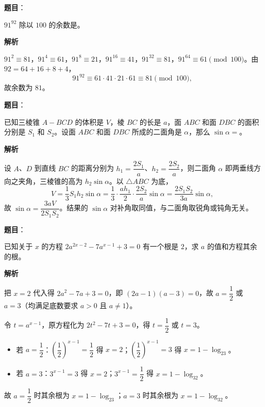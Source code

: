 \begin{answer}

\textbf{题目}：

$91^{92}$ 除以 $100$ 的余数是\underline{\qquad\qquad}。

\textbf{解析}

$91^2\equiv81$，$91^4\equiv61$，$91^8\equiv21$，$91^{16}\equiv41$，$91^{32}\equiv81$，$91^{64}\equiv61\pmod{100}$。由 $92=64+16+8+4$，
\nopagebreak[4]
\[
91^{92}\equiv61\cdot41\cdot21\cdot61\equiv81\pmod{100},
\]
故余数为 $81$。


\end{answer}
\begin{answer}

\textbf{题目}：

已知三棱锥 $A-BCD$ 的体积是 $V$，棱 $BC$ 的长是 $a$，面 $ABC$ 和面 $DBC$ 的面积分别是 $S_1$ 和 $S_2$。设面 $ABC$ 和面 $DBC$ 所成的二面角是 $\alpha$，那么 $\sin\alpha=$\underline{\qquad\qquad}。

\textbf{解析}

设 $A$、$D$ 到直线 $BC$ 的距离分别为 $h_1=\dfrac{2S_1}{a}$、$h_2=\dfrac{2S_2}{a}$，则二面角 $\alpha$ 即两垂线方向之夹角，三棱锥的高为 $h_2\sin\alpha$。以 $\triangle ABC$ 为底，
\nopagebreak[4]
\[
V=\frac13S_1h_2\sin\alpha=\frac13\cdot\frac{a h_1}{2}\cdot\frac{2S_2}{a}\sin\alpha=\frac{2S_1S_2}{3a}\sin\alpha,
\]
故 $\sin\alpha=\dfrac{3aV}{2S_1S_2}$。结果的 $\sin\alpha$ 对补角取同值，与二面角取锐角或钝角无关。


\end{answer}
\begin{answer}

\textbf{题目}：

已知关于 $x$ 的方程 $2a^{2x-2}-7a^{x-1}+3=0$ 有一个根是 $2$，求 $a$ 的值和方程其余的根。

\textbf{解析}

把 $x=2$ 代入得 $2a^2-7a+3=0$，即 $(2a-1)(a-3)=0$，故 $a=\dfrac12$ 或 $a=3$（均满足底数要求 $a>0$ 且 $a\ne1$）。

令 $t=a^{x-1}$，原方程化为 $2t^2-7t+3=0$，得 $t=\dfrac12$ 或 $t=3$。

\begin{itemize}
\item 若 $a=\dfrac12$：$\left(\dfrac12\right)^{x-1}=\dfrac12$ 得 $x=2$；$\left(\dfrac12\right)^{x-1}=3$ 得 $x=1-\log_23$。
\item 若 $a=3$：$3^{x-1}=3$ 得 $x=2$；$3^{x-1}=\dfrac12$ 得 $x=1-\log_32$。
\end{itemize}

故 $a=\dfrac12$ 时其余根为 $x=1-\log_23$；$a=3$ 时其余根为 $x=1-\log_32$。


\end{answer}
